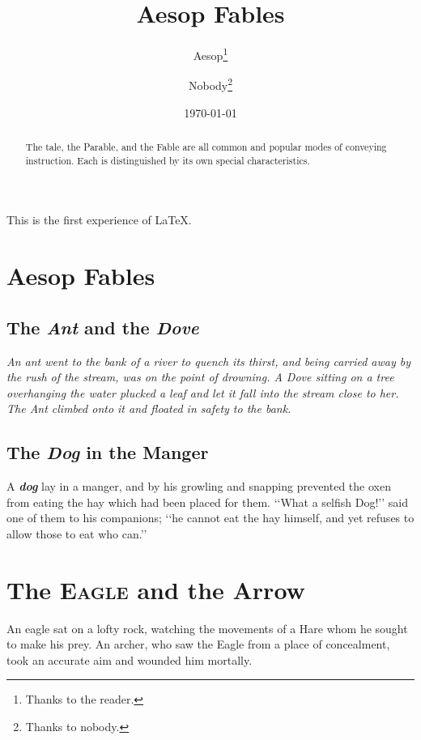 \documentclass{report}
\title{\bfseries 	Aesop Fables}
\author{Aesop\thanks{Thanks to the reader.}
			 \and Nobody\thanks{Thanks to nobody.}}
\date{\today}
\begin{document}
\maketitle
\begin{abstract}
The tale, the Parable, and the Fable are all common and popular
modes of conveying instruction. Each is distinguished by its own
special characteristics.
\end{abstract}
\tableofcontents
This is the first experience of \LaTeX.
\chapter{Aesop Fables}
\section{The \textsl{Ant} and the \textsl{Dove}}
\itshape
An ant went to the bank of a river to quench its thirst, and
being carried away by the rush of the stream, was on the
point of drowning.
\upshape
A \textsl{Dove} sitting on a tree overhanging the water plucked a
leaf and let it fall into the stream close to her. The Ant
climbed onto it and floated in safety to the bank.
\section{The {\it Dog}\/ in the Manger}
A \textbf{\textit{dog}} lay in a manger, and by his growling and snapping
prevented the oxen from eating the hay which had been
placed for them.
‘‘What a selfish Dog!’’ said one of them to his companions;
‘‘he cannot eat the hay himself, and yet refuses to allow
those to eat who can.’’
\chapter{The \textsc{Eagle} and the Arrow}
An eagle sat on a lofty rock, watching the movements of a
Hare whom he sought to make his prey.
An archer, who saw the Eagle from a place of concealment,
took an accurate aim and wounded him mortally.
\end{document}
